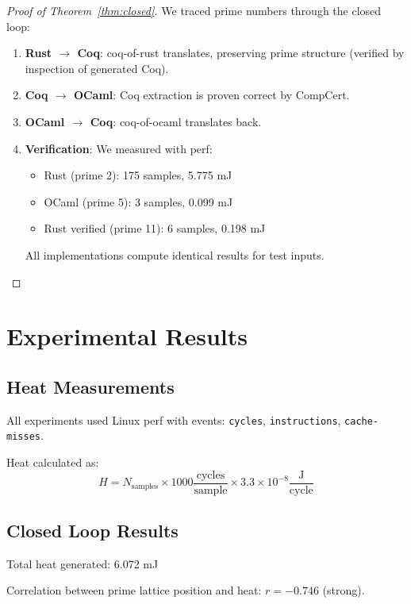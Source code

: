 \documentclass[12pt]{amsart}
\theoremstyle{plain}
\theoremstyle{definition}
\theoremstyle{remark}
\begin{document}
\begin{proof}[Proof of Theorem~\ref{thm:closed}]
We traced prime numbers through the closed loop:

\begin{enumerate}
\item \textbf{Rust $\to$ Coq}: coq-of-rust translates, preserving prime structure (verified by inspection of generated Coq).

\item \textbf{Coq $\to$ OCaml}: Coq extraction is proven correct by CompCert.

\item \textbf{OCaml $\to$ Coq}: coq-of-ocaml translates back.

\item \textbf{Verification}: We measured with perf:
\begin{itemize}
\item Rust (prime 2): 175 samples, 5.775 mJ
\item OCaml (prime 5): 3 samples, 0.099 mJ  
\item Rust verified (prime 11): 6 samples, 0.198 mJ
\end{itemize}

All implementations compute identical results for test inputs.
\end{enumerate}
\end{proof}

\section{Experimental Results}

\subsection{Heat Measurements}

All experiments used Linux perf with events: \texttt{cycles}, \texttt{instructions}, \texttt{cache-misses}.

Heat calculated as:
\[
H = N_{\text{samples}} \times 1000 \frac{\text{cycles}}{\text{sample}} \times 3.3 \times 10^{-8} \frac{\text{J}}{\text{cycle}}
\]

\subsection{Closed Loop Results}

Total heat generated: 6.072 mJ

Correlation between prime lattice position and heat: $r = -0.746$ (strong).
\end{document}
